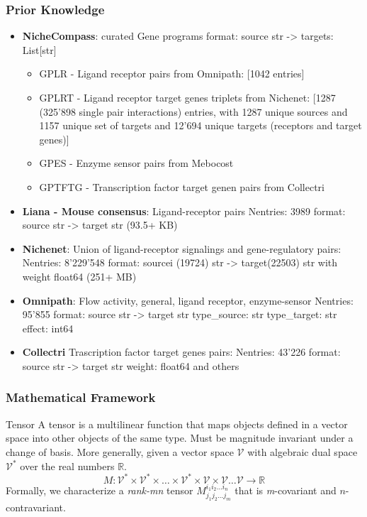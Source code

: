 \begin{frame}
    \frametitle{Prior Knowledge}
    \begin{itemize}
        \item \textbf{NicheCompass}: curated Gene programs\break
            format: source str -> targets: List[str]
            \begin{itemize}
                \item GPLR - Ligand receptor pairs from Omnipath: [1042 entries]
                \item GPLRT - Ligand receptor target genes triplets from Nichenet: [1287 (325'898 single pair interactions) entries, with 1287 unique sources and 1157 unique set of targets and 12'694 unique targets (receptors and target genes)]
                \item GPES - Enzyme sensor pairs from Mebocost
                \item GPTFTG - Transcription factor target genen pairs from Collectri
            \end{itemize}
        \item \textbf{Liana - Mouse consensus}: Ligand-receptor pairs\break
            Nentries: 3989 format: source str -> target str (93.5+ KB)
        \item \textbf{Nichenet}: Union of ligand-receptor signalings and gene-regulatory pairs:\break
            Nentries: 8'229'548 format: sourcei (19724) str -> target(22503) str with weight float64 (251+ MB)
        \item \textbf{Omnipath}: Flow activity, general, ligand receptor, enzyme-sensor\break
            Nentries: 95'855 format: source str -> target str type\_source: str type\_target: str effect: int64
        \item \textbf{Collectri} Trascription factor target genes pairs:\break
            Nentries: 43'226 format: source str -> target str weight: float64 and others
    \end{itemize}
\end{frame}    
\begin{frame}
    \frametitle{Mathematical Framework}
    \begin{definition}{Tensor}
        A tensor is a multilinear function that maps objects defined in a vector space into other objects of the same type. Must be magnitude invariant under a change of basis.
        More generally, given a vector space $\mathcal{V}$ with algebraic dual space $\mathcal{V}^*$ over the real numbers $\mathbb{R}$.
        \begin{equation}
            M: \mathcal{V}^* \times \mathcal{V}^* \times \ldots \times \mathcal{V}^* \times \mathcal{V} \times \mathcal{V} \ldots \mathcal{V} \to \mathbb{R}
        \end{equation}
        Formally, we characterize a \textit{rank-mn} tensor $M_{j_1j_2...j_m}^{i_1i_2...i_n}$ that is \textit{m}-covariant and $\textit{n}$-contravariant.
    \end{definition}
\end{frame}

